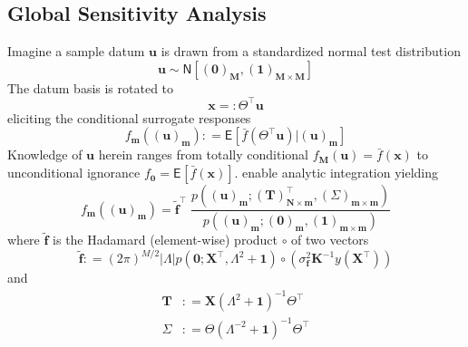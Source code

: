 \documentclass[preprint,12pt]{elsarticle}
\newcommand*{\M}[1]{\ensuremath{#1}\xspace}
\newcommand*{\vr}[1]{\M{\mathbf{#1}}}
\newcommand*{\deq}{\M{\mathrel{\mathop:}=}}
\newcommand*{\deqr}{\M{=\mathrel{\mathop:}}}
\newcommand*{\ev}[2][]{\mathsf{E}_{#1}\!\left\lbrack{} #2 \right\rbrack}
\newcommand*{\gauss}[2]{\mathsf{N}\!\left\lbrack{} #1 , #2 \right\rbrack}
\newcommand*{\modulus}[1]{\M{\left\lvert#1\right\rvert}}
\begin{document}
        \subsection{Global Sensitivity Analysis} \label{sub:Method:GSA}
            Imagine a sample datum \(\vr{u}\) is drawn from a standardized normal test distribution
            \begin{equation} \label{eq:Method:GSA:uDist}
                \vr{u} \sim \gauss{(\vr{0})_{\vr{M}}}{(\vr{1})_{\vr{M}\times\vr{M}}}
            \end{equation}
            The datum basis is rotated to
            \begin{equation} \label{eq:Method:GSA:Rotation}
                \vr{x} \deqr \Theta^{\intercal} \vr{u}
            \end{equation}
            eliciting the conditional surrogate responses
            \begin{equation} \label{eq:Method:GSA:fmDef}
                f_{\vr{m}}((\vr{u})_{\vr{m}}) 
                    \deq \ev{\bar{f}(\Theta^{\intercal} \vr{u}) \vert (\vr{u})_{\vr{m}}}
            \end{equation}    
            Knowledge of $\vr{u}$ herein ranges from totally conditional $f_{\vr{M}}(\vr{u})=\bar{f}(\vr{x})$ to unconditional ignorance $f_{\vr{0}}=\ev{\bar{f}(\vr{x})}$.
             enable analytic integration yielding
            \begin{equation} \label{eq:Method:GSA:fmCalc}
                f_{\vr{m}}((\vr{u})_{\vr{m}}) = \tilde{\vr{f}}^{\intercal} \; 
				\frac 
					{p\!\left((\vr{u})_{\vr{m}} ; (\vr{T})_{\vr{N}\times\vr{m}}^{\intercal}, (\Sigma)_{\vr{m}\times\vr{m}}\right)}
					{p\!\left((\vr{u})_{\vr{m}} ; (\vr{0})_{\vr{m}},(\vr{1})_{\vr{m}\times\vr{m}}\right)}
            \end{equation}
            where $\tilde{\vr{f}}$ is the Hadamard (element-wise) product $\circ$ of two vectors
            \begin{equation} \label{eq:Method:GSA:gDef}
                \tilde{\vr{f}} \deq
                (2 \pi)^{M/2} \modulus{\Lambda} p\!\left(\vr{0};\vr{X}^{\intercal} , \Lambda^{2} + \vr{1}\right)
                \circ\left(\sigma^{2}_\vr{f} \vr{K}^{-1} y(\vr{X}^{\intercal})\right) 
            \end{equation}
            and
            \begin{align} \label{eq:Method:GSA:TSigmaDef}
                \vr{T} &\deq 
                    \vr{X} \left(\Lambda^{2} + \vr{1}\right)^{-1} \Theta^{\intercal} \\
                \Sigma &\deq 
                    \Theta \left(\Lambda^{-2} + \vr{1}\right)^{-1} \Theta^{\intercal}
            \end{align}
\end{document}
